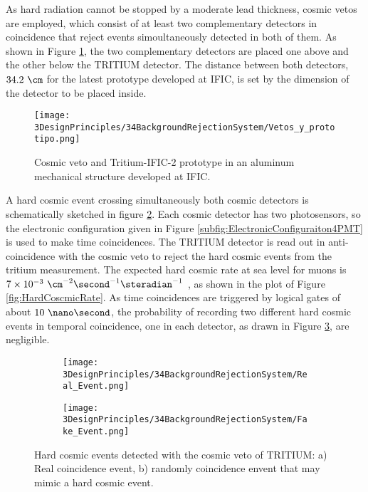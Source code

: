 As hard radiation cannot be stopped by a moderate lead thickness, cosmic vetos are employed, which consist of at least two complementary detectors in coincidence that reject events simoultaneously detected in both of them. As shown in Figure \ref{fig:VetoAndPrototype}, the two complementary detectors are placed one above and the other below the TRITIUM detector. The distance between both detectors, $34.2~\cm$ for the latest prototype developed at IFIC, is set by the dimension of the detector to be placed inside.

\begin{figure}[h]
\centering
\texttt{[image: 3DesignPrinciples/34BackgroundRejectionSystem/Vetos\_y\_prototipo.png]}
\caption{Cosmic veto and Tritium-IFIC-2 prototype in an aluminum mechanical structure developed at IFIC.\label{fig:VetoAndPrototype}}
\end{figure}

A hard cosmic event crossing simultaneously both cosmic detectors is schematically sketched in figure \ref{subfig:RealHardCosmicEvent}. Each cosmic detector has two photosensors, so the electronic configuration given in Figure \ref{subfig:ElectronicConfiguraiton4PMT} is used to make time coincidences. The TRITIUM detector is read out in anti-coincidence with the cosmic veto to reject the hard cosmic events from the tritium measurement. The expected hard cosmic rate at sea level for muons is $7\times 10^{-3}~\cm^{-2}\second^{-1}\steradian^{-1}$ \cite{PDG, HardCosmicMuonRate}, as shown in the plot of Figure \ref{fig:HardCoscmicRate}. As time coincidences are triggered by logical gates of about $10~\nano\second$, the probability of recording two different hard cosmic events in temporal coincidence, one in each detector, as drawn in Figure \ref{subfig:FakeHardCosmicEvent}, are negligible.

\begin{figure}[h]
\centering
    \begin{subfigure}[b]{0.45\textwidth}
    \centering
    \texttt{[image: 3DesignPrinciples/34BackgroundRejectionSystem/Real\_Event.png]}  
    \caption{\label{subfig:RealHardCosmicEvent}}
    \end{subfigure}
    \hfill
    \begin{subfigure}[b]{0.45\textwidth}
    \centering
    \texttt{[image: 3DesignPrinciples/34BackgroundRejectionSystem/Fake\_Event.png]}  
    \caption{\label{subfig:FakeHardCosmicEvent}}
    \end{subfigure}
   \caption{Hard cosmic events detected with the cosmic veto of TRITIUM: a) Real coincidence event, b) randomly coincidence envent that may mimic a hard cosmic event.}
 \label{fig:HardCosmicEventsSimulation}
\end{figure}

